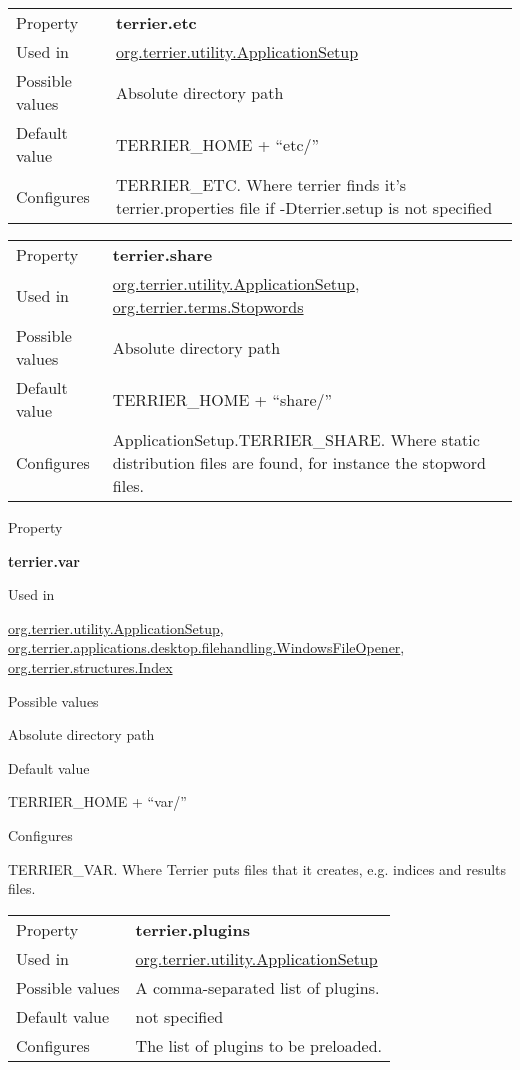 \begin{longtable}[]{@{}ll@{}}
\toprule
Property & \textbf{terrier.etc}\tabularnewline
Used in &
\href{javadoc/org/terrier/utility/ApplicationSetup.html}{org.terrier.utility.ApplicationSetup}\tabularnewline
Possible values & Absolute directory path\tabularnewline
Default value & TERRIER\_HOME + ``etc/''\tabularnewline
Configures & TERRIER\_ETC. Where terrier finds it's terrier.properties
file if -Dterrier.setup is not specified\tabularnewline
\bottomrule
\end{longtable}

\begin{longtable}[]{@{}ll@{}}
\toprule
Property & \textbf{terrier.share}\tabularnewline
Used in &
\href{javadoc/org/terrier/utility/ApplicationSetup.html}{org.terrier.utility.ApplicationSetup},
\href{javadoc/org/terrier/terms/Stopwords.html}{org.terrier.terms.Stopwords}\tabularnewline
Possible values & Absolute directory path\tabularnewline
Default value & TERRIER\_HOME + ``share/''\tabularnewline
Configures & ApplicationSetup.TERRIER\_SHARE. Where static distribution
files are found, for instance the stopword files.\tabularnewline
\bottomrule
\end{longtable}

Property

\textbf{terrier.var}

Used in

\href{javadoc/org/terrier/utility/ApplicationSetup.html}{org.terrier.utility.ApplicationSetup},
\href{javadoc/org/terrier/applications/desktop/filehandling/WindowsFileOpener.html}{org.terrier.applications.desktop.filehandling.WindowsFileOpener},
\href{javadoc/org/terrier/structures/Index.html}{org.terrier.structures.Index}

Possible values

Absolute directory path

Default value

TERRIER\_HOME + ``var/''

Configures

TERRIER\_VAR. Where Terrier puts files that it creates, e.g. indices and
results files.

\begin{longtable}[]{@{}ll@{}}
\toprule
Property & \textbf{terrier.plugins}\tabularnewline
Used in &
\href{javadoc/org/terrier/utility/ApplicationSetup.html}{org.terrier.utility.ApplicationSetup}\tabularnewline
Possible values & A comma-separated list of plugins.\tabularnewline
Default value & not specified\tabularnewline
Configures & The list of plugins to be preloaded.\tabularnewline
\bottomrule
\end{longtable}

